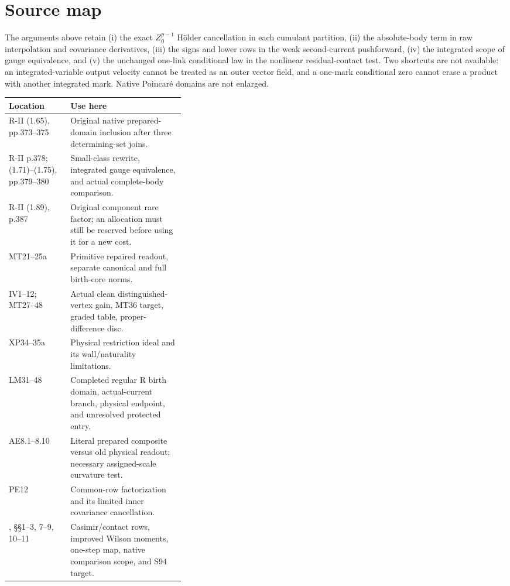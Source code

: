 \documentclass[11pt,letterpaper]{article}
\theoremstyle{plain}
\theoremstyle{remark}\newtheorem{remark}[theorem]{Scope}
\begin{document}
\appendix
\section{Source map}

The arguments above retain (i) the exact
$Z_0^{p-1}$ H\"older cancellation in each cumulant partition,
(ii) the absolute-body term in raw interpolation and covariance derivatives,
(iii) the signs and lower rows in the weak second-current pushforward,
(iv) the integrated scope of gauge equivalence, and (v) the unchanged
one-link conditional law in the nonlinear residual-contact test.
Two shortcuts are not available:
an integrated-variable output velocity cannot be treated as an outer vector
field, and a one-mark conditional zero cannot erase a product with another
integrated mark. Native Poincar\'e domains are not enlarged.

\begin{center}
\small
\begin{tabularx}{\linewidth}{@{}>{\raggedright\arraybackslash}p{0.35\linewidth}X@{}}
\toprule
Location & Use here\\
\midrule
R-II (1.65), pp.373--375 & Original native prepared-domain inclusion after
three determining-set joins.\\[3pt]
R-II p.378; (1.71)--(1.75), pp.379--380 & Small-class rewrite, integrated gauge
equivalence, and actual complete-body comparison.\\[3pt]
R-II (1.89), p.387 & Original component rare factor; an allocation must still
be reserved before using it for a new cost.\\[3pt]
\cite[pp.~686--688]{W} MT21--25a & Primitive repaired readout, separate canonical
and full birth-core norms.\\[3pt]
\cite[pp.~678--680, 689--696]{W} IV1--12; MT27--48 & Actual clean distinguished-vertex
gain, MT36 target, graded table, proper-difference disc.\\[3pt]
\cite[pp.~726--727]{W} XP34--35a & Physical restriction ideal and its wall/naturality
limitations.\\[3pt]
\cite[pp.~778--783]{W} LM31--48 & Completed regular R birth domain, actual-current
branch, physical endpoint, and unresolved protected entry.\\[3pt]
\cite[pp.~932--935]{W} AE8.1--8.10 & Literal prepared composite versus old physical
readout; necessary assigned-scale curvature test.\\[3pt]
\cite[pp.~1174--1180]{W} PE12 & Common-row factorization and its limited inner
covariance cancellation.\\[3pt]
\cite{PW}, \S\S1--3, 7--9, 10--11 & Casimir/contact rows, improved Wilson
moments, one-step map, native comparison scope, and S94 target.\\
\bottomrule
\end{tabularx}
\end{center}
\end{document}

